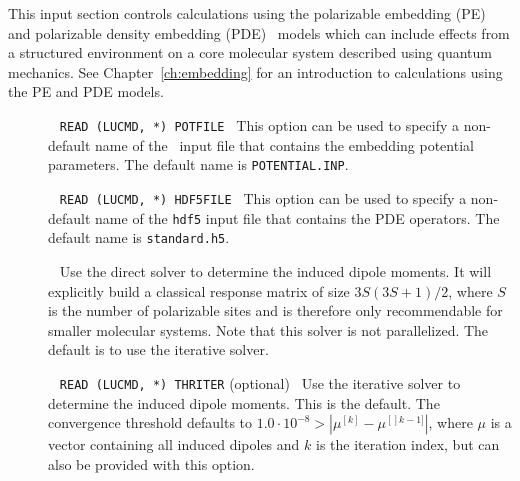 This input section controls calculations using the polarizable
embedding (PE)~\cite{pemodel1,pemodel2}
and polarizable density embedding (PDE)~\cite{pde1,pde2,pde3} models
which can include effects from a structured
environment on a core molecular system described using quantum mechanics.
See Chapter~\ref{ch:embedding} for an introduction to
calculations using the PE and PDE models.

\begin{description}

\item[]\verb| |\newline
\verb|READ (LUCMD, *) POTFILE|\verb| |\newline
This option can be used to specify a non-default name of the \potinp\ input file that contains the embedding potential parameters. The default name is \verb|POTENTIAL.INP|.

\item[]\verb| |\newline
\verb|READ (LUCMD, *) HDF5FILE|\verb| |\newline
This option can be used to specify a non-default name of the \verb|hdf5| input file that contains the PDE operators. The default name is \verb|standard.h5|.

\item[]\verb| |\newline
Use the direct solver to determine the induced dipole moments. It will explicitly build a classical response matrix of size $3S(3S+1)/2$, where $S$ is the number of polarizable sites and is therefore only recommendable for smaller molecular systems. Note that this solver is not parallelized. The default is to use the iterative solver.

\item[]\verb| |\newline
\verb|READ (LUCMD, *) THRITER| (optional)\verb| |\newline
Use the iterative solver to determine the induced dipole moments. This is the default. The convergence threshold defaults to $1.0\cdot10^{-8} > |\mu^{[k]} - \mu^{[]k-1]}|$, where $\mu$ is a vector containing all induced dipoles and $k$ is the iteration index, but can also be provided with this option.


\end{description}
